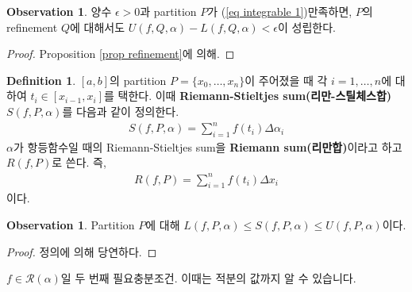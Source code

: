 \documentclass[12pt]{article}
\theoremstyle{definition}
\newtheorem{defn}[thm]{Definition}
\newtheorem{obs}[thm]{Observation}
\def\eps{\epsilon}
\def\calR{\mathcal{R}}
\begin{document}
\begin{obs} \label{obs refinement}
	양수 \(\eps > 0\)과 partition \(P\)가 (\ref{eq integrable 1})\을 만족하면, \(P\)의 refinement \(Q\)에 대해서도 \(U(f, Q, \alpha) - L(f, Q, \alpha) < \eps\)이 성립한다.
\end{obs}
\begin{proof}
	Proposition \ref{prop refinement}에 의해.
\end{proof}

\begin{defn}
	\([a, b]\)의 partition \(P = \{x_0, \ldots, x_n\}\)이 주어졌을 때 각 \(i = 1, \ldots, n\)에 대하여 \(t_i \in [x_{i-1}, x_i]\)를 택한다. 이때 \textbf{Riemann-Stieltjes sum(리만-스틸체스합)} \(S(f, P, \alpha)\)를 다음과 같이 정의한다.
	\begin{gather*}
		S(f, P, \alpha) = \sum_{i=1}^n f(t_i)\Delta\alpha_i
	\end{gather*}
	\(\alpha\)가 항등함수일 때의 Riemann-Stieltjes sum을 \textbf{Riemann sum(리만합)}이라고 하고 \(R(f, P)\)로 쓴다. 즉,
	\begin{gather*}
		R(f, P) = \sum_{i=1}^n f(t_i)\Delta x_i
	\end{gather*}
	이다.
\end{defn}

\begin{obs} \label{obs st sum}
	Partition \(P\)에 대해 \(L(f, P, \alpha) \le S(f, P, \alpha) \le U(f, P, \alpha)\)이다.
\end{obs}
\begin{proof}
	정의에 의해 당연하다.
\end{proof}

\(f \in \calR(\alpha)\)일 두 번째 필요충분조건. 이때는 적분의 값까지 알 수 있습니다.
\end{document}
